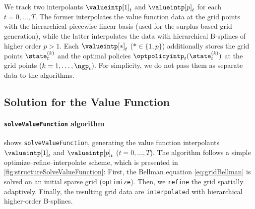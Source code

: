 We track two interpolants $\valueintp[1]_t$ and $\valueintp[p]_t$
for each $t = 0, \dotsc, T$.
The former interpolates the value function data at the grid points
with the hierarchical piecewise linear basis
(used for the surplus-based grid generation),
while the latter interpolates the data with hierarchical B-splines
of higher order $p > 1$.
Each $\valueintp[\ast]_t$ ($\ast \in \{1, p\}$)
additionally stores the grid points $\state_t^{(k)}$
and the optimal policies $\optpolicyintp_t(\state_t^{(k)})$
at the grid points ($k = 1, \dotsc, \ngp_t$).
For simplicity, we do not pass them as separate data
to the algorithms.



\subsection{Solution for the Value Function}
\label{sec:822solveValueFunction}

\paragraph{\texttt{solveValueFunction} algorithm}

 shows \texttt{solveValueFunction},
generating the value function interpolants
$\valueintp[1]_t$ and $\valueintp[p]_t$ ($t = 0, \dotsc, T$).
The algorithm follows a simple optimize--refine--interpolate scheme,
which is presented in \cref{fig:structureSolveValueFunction}:
First, the Bellman equation \eqref{eq:gridBellman} is solved
on an initial sparse grid (\texttt{optimize}).
Then, we \texttt{refine} the grid spatially adaptively.
Finally, the resulting grid data are \texttt{interpolate}d
with hierarchical higher-order B-splines.

\begin{algorithm}
  \begin{algorithmic}[1]
      \EndFor{}
    \EndFunction{}
  \end{algorithmic}
  \caption[%
    Generation of value function interpolants (\texttt{solveValueFunction})%
  ]{%
    Generation of value function interpolants.
    The output is the higher-order B-spline interpolant $\valueintp[p]_t$
    for all $t = 0, \dotsc, T$.%
  }%
  \label{alg:financeSolveValueFunction}%
\end{algorithm}

